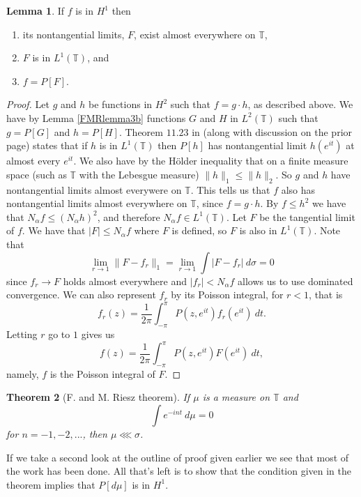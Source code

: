 \documentclass[a4paper,12pt,twoside,BCOR=10mm]{scrbook}
\newtheorem{theorem}{Theorem}[section]
\theoremstyle{definition}
\theoremstyle{definition}
\newtheorem{lemma}[theorem]{Lemma}
\theoremstyle{definition}
\begin{document}
\begin{lemma}
\label{FMRlemma2}
If $f$ is in $H^1$ then
\begin{enumerate}
\item \label{p1}
its nontangential limits, $F$, exist almost everywhere on $\mathbb{T}$,
\item \label{p2}
$F$ is in $L^1(\mathbb{T})$, and
\item \label{p3}
$f = P[F]$.
\end{enumerate}
\end{lemma}
\begin{proof}
Let $g$ and $h$ be functions in $H^2$ such that $f = g \cdot h$, as described above.
We have by Lemma \ref{FMRlemma3b} functions $G$ and $H$ in $L^2(\mathbb{T})$ such that $g = P[G]$ and $h = P[H]$.
Theorem $11.23$ in \citep{rudin2} (along with discussion on the prior page) states that if $h$ is in $L^1(\mathbb{T})$ then $P[h]$ has nontangential limit $h(e^{it})$ at almost every $e^{it}$.
We also have by the Hölder inequality that on a finite measure space (such as $\mathbb{T}$ with the Lebesgue measure) $\|h\|_1 \leq \|h\|_2$.
So $g$ and $h$ have nontangential limits almost everywere on $\mathbb{T}$.
This tells us that $f$ also has nontangential limits almost everywhere on $\mathbb{T}$, since $f = g \cdot h$.
By $f \leq h^2$ we have that $N_{\alpha}f \leq (N_{\alpha}h)^2$, and therefore $N_{\alpha}f \in L^1(\mathbb{T})$.
Let $F$ be the tangential limit of $f$.
We have that $|F| \leq N_{\alpha}f$ where $F$ is defined, so $F$ is also in $L^1(\mathbb{T})$.
Note that
\[
	\lim_{r \rightarrow 1} \|F - f_r\|_1 = \lim_{r \rightarrow 1} \int |F - f_r|\ d\sigma = 0
\]
since $f_r \rightarrow F$ holds almost everywhere and $|f_r| < N_{\alpha}f$ allows us to use dominated convergence.
We can also represent $f_r$ by its Poisson integral, for $r < 1$, that is
\[
	f_r(z) = \frac{1}{2\pi} \int_{-\pi}^{\pi} P(z, e^{it})f_r(e^{it})\ dt.
\]
Letting $r$ go to $1$ gives us
\[
	f(z) = \frac{1}{2\pi} \int_{-\pi}^{\pi} P(z, e^{it})F(e^{it})\ dt,
\]
namely, $f$ is the Poisson integral of $F$.
\end{proof}
\begin{theorem}[F. and M. Riesz theorem]
If $\mu$ is a measure on $\mathbb{T}$ and
\[
	\int e^{-int}\ d\mu = 0
\]
for $n = -1, -2, ...$, then $\mu \lll \sigma$.
\end{theorem}
If we take a second look at the outline of proof given earlier we see that most of the work has been done.
All that's left is to show that the condition given in the theorem implies that $P[d\mu]$ is in $H^1$.
\end{document}

